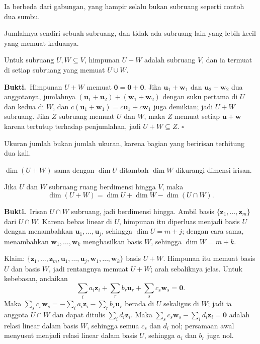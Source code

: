 Ia berbeda dari gabungan, yang hampir selalu bukan subruang seperti contoh dua sumbu.

Jumlahnya sendiri sebuah subruang, dan tidak ada subruang lain yang lebih kecil yang
memuat keduanya.

\begin{proposisi}
Untuk subruang $U,W\subseteq V$, himpunan $U+W$ adalah subruang $V$, dan ia termuat di
setiap subruang yang memuat $U\cup W$.
\end{proposisi}

\par\medskip\noindent\textbf{Bukti.}\ 
Himpunan $U+W$ memuat $\mathbf{0}=\mathbf{0}+\mathbf{0}$. Jika
$\mathbf{u}_{1}+\mathbf{w}_{1}$ dan $\mathbf{u}_{2}+\mathbf{w}_{2}$ dua anggotanya, jumlahnya
$(\mathbf{u}_{1}+\mathbf{u}_{2})+(\mathbf{w}_{1}+\mathbf{w}_{2})$ dengan suku pertama di $U$
dan kedua di $W$, dan $c(\mathbf{u}_{1}+\mathbf{w}_{1})=c\mathbf{u}_{1}+c\mathbf{w}_{1}$ juga
demikian; jadi $U+W$ subruang. Jika $Z$ subruang memuat $U$ dan $W$, maka $Z$ memuat setiap
$\mathbf{u}+\mathbf{w}$ karena tertutup terhadap penjumlahan, jadi $U+W\subseteq Z$.
\hfill$\square$\par\medskip

Ukuran jumlah bukan jumlah ukuran, karena bagian yang beririsan terhitung dua kali.

$\dim(U+W)$ sama dengan $\dim U$ ditambah $\dim W$ dikurangi dimensi irisan.

\begin{teorema}
Jika $U$ dan $W$ subruang ruang berdimensi hingga $V$, maka
\[
  \dim(U+W)=\dim U+\dim W-\dim(U\cap W).
\]
\end{teorema}

\par\medskip\noindent\textbf{Bukti.}\ 
Irisan $U\cap W$ subruang, jadi berdimensi hingga. Ambil basis
$\{\mathbf{z}_{1},\dots,\mathbf{z}_{m}\}$ dari $U\cap W$. Karena bebas linear di $U$,
himpunan itu diperluas menjadi basis $U$ dengan menambahkan $\mathbf{u}_{1},\dots,
\mathbf{u}_{j}$, sehingga $\dim U=m+j$; dengan cara sama, menambahkan
$\mathbf{w}_{1},\dots,\mathbf{w}_{k}$ menghasilkan basis $W$, sehingga $\dim W=m+k$.

Klaim: $\{\mathbf{z}_{1},\dots,\mathbf{z}_{m},\mathbf{u}_{1},\dots,\mathbf{u}_{j},
\mathbf{w}_{1},\dots,\mathbf{w}_{k}\}$ basis $U+W$. Himpunan itu memuat basis $U$ dan basis
$W$, jadi rentangnya memuat $U+W$; arah sebaliknya jelas. Untuk kebebasan, andaikan
\[
  \sum_{i}a_{i}\mathbf{z}_{i}+\sum_{r}b_{r}\mathbf{u}_{r}
  +\sum_{s}c_{s}\mathbf{w}_{s}=\mathbf{0}.
\]
Maka $\sum_{s}c_{s}\mathbf{w}_{s}=-\sum_{i}a_{i}\mathbf{z}_{i}-\sum_{r}b_{r}\mathbf{u}_{r}$
berada di $U$ sekaligus di $W$; jadi ia anggota $U\cap W$ dan dapat ditulis
$\sum_{i}d_{i}\mathbf{z}_{i}$. Maka $\sum_{s}c_{s}\mathbf{w}_{s}-\sum_{i}d_{i}\mathbf{z}_{i}
=\mathbf{0}$ adalah relasi linear dalam basis $W$, sehingga semua $c_{s}$ dan $d_{i}$ nol;
persamaan awal menyusut menjadi relasi linear dalam basis $U$, sehingga $a_{i}$ dan $b_{r}$
juga nol.


